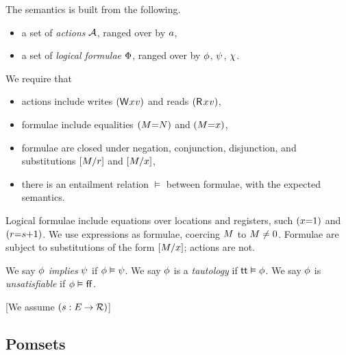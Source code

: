 The semantics is built from the following.
\begin{itemize}
\item a set of \emph{actions} $\mathcal{A}$, ranged over by $a$, 
\item a set of \emph{logical formulae} $\Phi$, ranged over by $\phi$,
  $\psi$, $\chi$.
\end{itemize}
We require that
\begin{itemize}
\item actions include writes $\DWP{\aLoc}{\aVal}$ and reads $\DRP{\aLoc}{\aVal}$,
\item formulae include equalities $(M{=}N)$ and $(M{=}x)$,
\item formulae are closed under negation, conjunction, disjunction, and
  substitutions $[M/r]$ and $[M/x]$, 
\item there is an entailment relation $\vDash$ between formulae, with the
  expected semantics.
\end{itemize}


Logical formulae include equations over locations and registers, such
$(x{=}1)$ and $(r{=}s{+}1)$.
We use expressions as formulae, coercing $M$ to $M\neq 0$.
Formulae are subject to substitutions of the form $[M/x]$; actions are not.

  We say
  $\phi$ \emph{implies} $\psi$ if $\phi\vDash\psi$.
  We say
  $\phi$ is a \emph{tautology} if $\mathsf{tt}\vDash\phi$.
  We say
  $\phi$ is \emph{unsatisfiable} if $\phi\vDash\mkern.6mu\mathsf{ff}\mkern.6mu$.


[We assume $(s:E\mathbin\rightarrow\mathcal{R})$]


\subsection{Pomsets}

